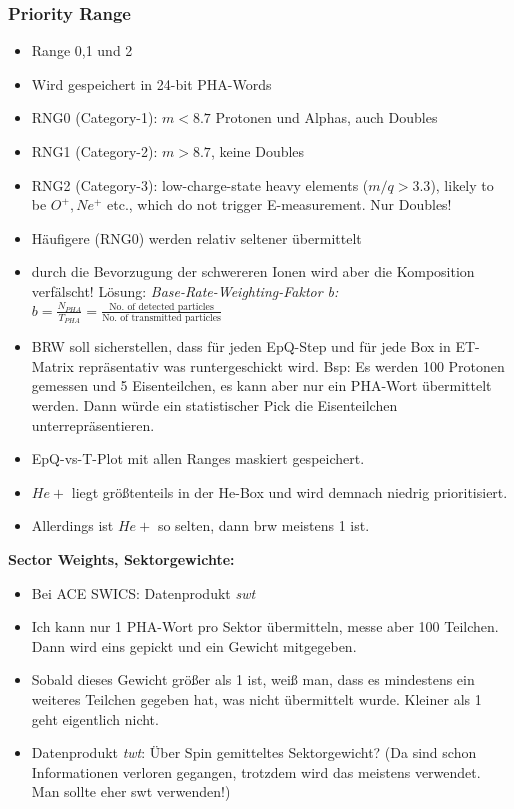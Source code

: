 \documentclass[]{article}
\begin{document}
\subsubsection{Priority Range}
\begin{itemize}
	\item Range 0,1 und 2
	\item Wird gespeichert in 24-bit PHA-Words
	\item RNG0 (Category-1): $m<8.7$ Protonen und Alphas, auch Doubles
	\item RNG1 (Category-2): $m>8.7$, keine Doubles
	\item RNG2 (Category-3): low-charge-state heavy elements ($m/q > 3.3$), likely to be $O^+, Ne^+$ etc., which do not trigger E-measurement. Nur Doubles!
	\item Häufigere (RNG0) werden relativ seltener übermittelt
	\item durch die Bevorzugung der schwereren Ionen wird aber die Komposition verfälscht! Lösung: \textit{Base-Rate-Weighting-Faktor b:}\\ $b = \frac{N_{PHA}}{T_{PHA}} = \frac{\text{No. of detected particles}}{\text{No. of transmitted particles}}$
	\item BRW soll sicherstellen, dass für jeden EpQ-Step und für jede Box in ET-Matrix repräsentativ was runtergeschickt wird. Bsp: Es werden 100 Protonen gemessen und 5 Eisenteilchen, es kann aber nur ein PHA-Wort übermittelt werden. Dann würde ein statistischer Pick die Eisenteilchen unterrepräsentieren.
	\item EpQ-vs-T-Plot mit allen Ranges maskiert gespeichert.
	\item $He+$ liegt größtenteils in der He-Box und wird demnach niedrig prioritisiert.
	\item Allerdings ist $He+$ so selten, dann brw meistens 1 ist.
\end{itemize}
\textbf{Sector Weights, Sektorgewichte:}
\begin{itemize}
	\item Bei ACE SWICS: Datenprodukt \textit{swt}
	\item Ich kann nur 1 PHA-Wort pro Sektor übermitteln, messe aber 100 Teilchen. Dann wird eins gepickt und ein Gewicht mitgegeben.
	\item Sobald dieses Gewicht größer als 1 ist, weiß man, dass es mindestens ein weiteres Teilchen gegeben hat, was nicht übermittelt wurde. Kleiner als 1 geht eigentlich nicht.
	\item Datenprodukt \textit{twt}: Über Spin gemitteltes Sektorgewicht? (Da sind schon Informationen verloren gegangen, trotzdem wird das meistens verwendet. Man sollte eher swt verwenden!)
\end{itemize}
%
%
%
\end{document}
